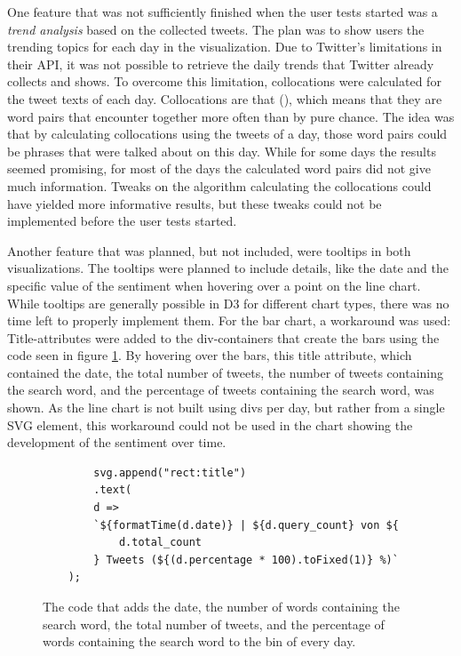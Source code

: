 One feature that was not sufficiently finished when the user tests started was a \emph{trend analysis} based on the collected tweets. The plan was to show users the trending topics for each day in the visualization. Due to Twitter's limitations in their API, it was not possible to retrieve the daily trends that Twitter already collects and shows. 
To overcome this limitation, collocations were calculated for the tweet texts of each day. Collocations are  that  (\cite[2]{mckeown2000collocations}), which means that they are word pairs that encounter together more often than by pure chance. The idea was that by calculating collocations using the tweets of a day, those word pairs could be phrases that were talked about on this day. While for some days the results seemed promising, for most of the days the calculated word pairs did not give much information. Tweaks on the algorithm calculating the collocations could have yielded more informative results, but these tweaks could not be implemented before the user tests started.

Another feature that was planned, but not included, were tooltips in both visualizations. The tooltips were planned to include details, like the date and the specific value of the sentiment when hovering over a point on the line chart. While tooltips are generally possible in D3 for different chart types, there was no time left to properly implement them. For the bar chart, a workaround was used: Title-attributes were added to the div-containers that create the bars using the code seen in figure \ref{code:details_title}. By hovering over the bars, this title attribute, which contained the date, the total number of tweets, the number of tweets containing the search word, and the percentage of tweets containing the search word, was shown. As the line chart is not built using divs per day, but rather from a single SVG element, this workaround could not be used in the chart showing the development of the sentiment over time.

\begin{figure}[h!]
    \begin{verbatim}
        svg.append("rect:title")
        .text(
        d =>
        `${formatTime(d.date)} | ${d.query_count} von ${
            d.total_count
        } Tweets (${(d.percentage * 100).toFixed(1)} %)`
    );
    \end{verbatim}
    \caption{The code that adds the date, the number of words containing the search word, the total number of tweets, and the percentage of words containing the search word to the bin of every day.}
    \label{code:details_title}
\end{figure}

